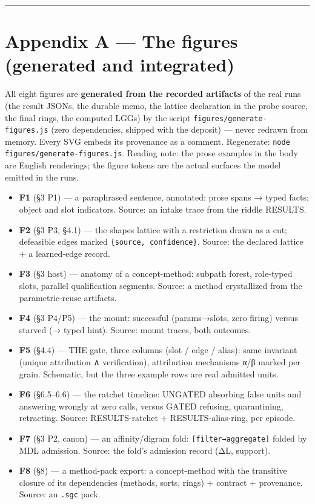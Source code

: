 \documentclass[11pt]{article}
\begin{document}
\medskip\hrule\medskip

\section*{Appendix A — The figures (generated and integrated)}

All eight figures are \textbf{generated from the recorded artifacts} of the real runs (the result JSONs, the durable memo, the lattice declaration in the probe source, the final rings, the computed LGGs) by the script \texttt{figures/generate-figures.js} (zero dependencies, shipped with the deposit) — never redrawn from memory. Every SVG embeds its provenance as a comment. Regenerate: \texttt{node figures/generate-figures.js}. Reading note: the prose examples in the body are English renderings; the figure tokens are the actual surfaces the model emitted in the runs.

\begin{itemize}
\item \textbf{F1} (§3 P1) — a paraphrased sentence, annotated: prose spans → typed facts; object and slot indicators. Source: an intake trace from the riddle RESULTS.
\item \textbf{F2} (§3 P3, §4.1) — the shapes lattice with a restriction drawn as a cut; defeasible edges marked \texttt{\{source, confidence\}}. Source: the declared lattice + a learned-edge record.
\item \textbf{F3} (§3 host) — anatomy of a concept-method: subpath forest, role-typed slots, parallel qualification segments. Source: a method crystallized from the parametric-reuse artifacts.
\item \textbf{F4} (§3 P4/P5) — the mount: successful (params→slots, zero firing) versus starved (→ typed hint). Source: mount traces, both outcomes.
\item \textbf{F5} (§4.4) — THE gate, three columns (slot / edge / alias): same invariant (unique attribution ∧ verification), attribution mechanisms α/β marked per grain. Schematic, but the three example rows are real admitted units.
\item \textbf{F6} (§6.5–6.6) — the ratchet timeline: UNGATED absorbing false units and answering wrongly at zero calls, versus GATED refusing, quarantining, retracting. Source: RESULTS-ratchet + RESULTS-alias-ring, per episode.
\item \textbf{F7} (§3 P2, canon) — an affinity/digram fold: \texttt{[filter→aggregate]} folded by MDL admission. Source: the fold's admission record (ΔL, support).
\item \textbf{F8} (§8) — a method-pack export: a concept-method with the transitive closure of its dependencies (methods, sorts, rings) + contract + provenance. Source: an \texttt{.sgc} pack.
\end{itemize}
\end{document}
